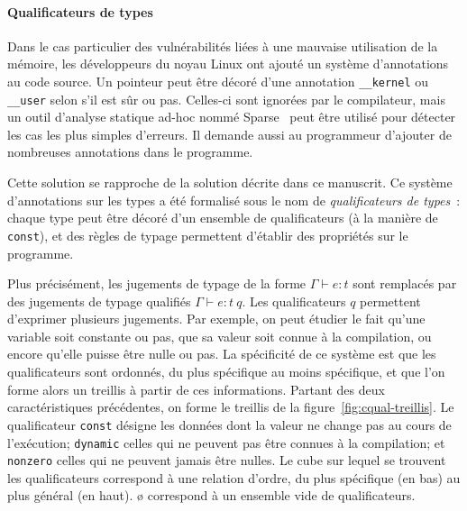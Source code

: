 \paragraph{Qualificateurs de types}

Dans le cas particulier des vulnérabilités liées à une mauvaise utilisation de
la mémoire, les développeurs du noyau Linux ont ajouté un système d'annotations
au code source. Un pointeur peut être décoré d'une annotation
\texttt{\_\_kernel} ou \texttt{\_\_user} selon s'il est sûr ou pas. Celles-ci
sont ignorées par le compilateur, mais un outil d'analyse statique ad-hoc nommé
Sparse~ peut être utilisé pour détecter les cas les plus simples
d'erreurs. Il demande aussi au programmeur d'ajouter de nombreuses annotations
dans le programme.

Cette solution se rapproche de la solution décrite dans ce manuscrit. Ce système
d'annotations sur les types a été formalisé sous le nom de \emph{qualificateurs
de types}~\cite{toplas-quals}: chaque type peut être décoré d'un ensemble de
qualificateurs (à la manière de \texttt{const}), et des règles de typage
permettent d'établir des propriétés sur le programme.

Plus précisément, les jugements de typage de la forme $Γ ⊢ e : t$ sont remplacés
par des jugements de typage qualifiés $Γ ⊢ e : t~q$. Les qualificateurs $q$
permettent d'exprimer plusieurs jugements. Par exemple, on peut étudier le fait
qu'une variable soit constante ou pas, que sa valeur soit connue à la
compilation, ou encore qu'elle puisse être nulle ou pas. La spécificité de ce
système est que les qualificateurs sont ordonnés, du plus spécifique au moins
spécifique, et que l'on forme alors un treillis à partir de ces informations.
Partant des deux caractéristiques précédentes, on forme le treillis de la
figure~\ref{fig:cqual-treillis}. Le qualificateur \texttt{const} désigne les
données dont la valeur ne change pas au cours de l'exécution; \texttt{dynamic}
celles qui ne peuvent pas être connues à la compilation; et \texttt{nonzero}
celles qui ne peuvent jamais être nulles. Le cube sur lequel se trouvent les
qualificateurs correspond à une relation d'ordre, du plus spécifique (en bas) au
plus général (en haut). ø correspond à un ensemble vide de qualificateurs.

